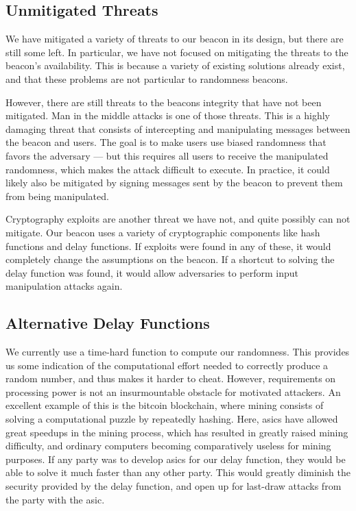\subsection{Unmitigated Threats}
We have mitigated a variety of threats to our beacon in its design, but there are still some left. In particular, we have not focused on mitigating the threats to the beacon's availability. This is because a variety of existing solutions already exist, and that these problems are not particular to randomness beacons.

However, there are still threats to the beacons integrity that have not been mitigated. Man in the middle attacks is one of those threats. This is a highly damaging threat that consists of intercepting and manipulating messages between the beacon and users. The goal is to make users use biased randomness that favors the adversary --- but this requires all users to receive the manipulated randomness, which makes the attack difficult to execute. In practice, it could likely also be mitigated by signing messages sent by the beacon to prevent them from being manipulated.

Cryptography exploits are another threat we have not, and quite possibly can not mitigate. Our beacon uses a variety of cryptographic components like hash functions and delay functions. If exploits were found in any of these, it would completely change the assumptions on the beacon.
If a shortcut to solving the delay function was found, it would allow adversaries to perform input manipulation attacks again.

\subsection{Alternative Delay Functions}
We currently use a time-hard function to compute our randomness. This provides us some indication of the computational effort needed to correctly produce a random number, and thus makes it harder to cheat.
However, requirements on processing power is not an insurmountable obstacle for motivated attackers. An excellent example of this is the bitcoin blockchain, where mining consists of solving a computational puzzle by repeatedly hashing. Here, \glspl{asic} have allowed great speedups in the mining process, which has resulted in greatly raised mining difficulty, and ordinary computers becoming comparatively useless for mining purposes.
If any party was to develop \glspl{asic} for our delay function, they would be able to solve it much faster than any other party. This would greatly diminish the security provided by the delay function, and open up for last-draw attacks from the party with the \gls{asic}.


